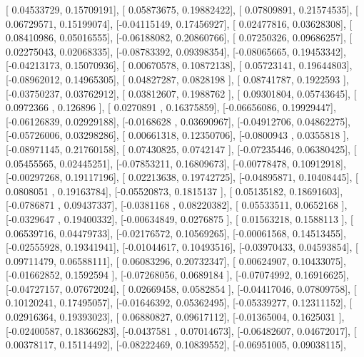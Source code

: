 \documentclass{article}
\begin{document}
       [ 0.04533729,  0.15709191],
       [ 0.05873675,  0.19882422],
       [ 0.07809891,  0.21574535],
       [ 0.06729571,  0.15199074],
       [-0.04115149,  0.17456927],
       [ 0.02477816,  0.03628308],
       [ 0.08410986,  0.05016555],
       [-0.06188082,  0.20860766],
       [ 0.07250326,  0.09686257],
       [ 0.02275043,  0.02068335],
       [-0.08783392,  0.09398354],
       [-0.08065665,  0.19453342],
       [-0.04213173,  0.15070936],
       [ 0.00670578,  0.10872138],
       [ 0.05723141,  0.19644803],
       [-0.08962012,  0.14965305],
       [ 0.04827287,  0.0828198 ],
       [ 0.08741787,  0.1922593 ],
       [-0.03750237,  0.03762912],
       [ 0.03812607,  0.1988762 ],
       [ 0.09301804,  0.05743645],
       [ 0.0972366 ,  0.126896  ],
       [ 0.0270891 ,  0.16375859],
       [-0.06656086,  0.19929447],
       [-0.06126839,  0.02929188],
       [-0.0168628 ,  0.03690967],
       [-0.04912706,  0.04862275],
       [-0.05726006,  0.03298286],
       [ 0.00661318,  0.12350706],
       [-0.0800943 ,  0.0355818 ],
       [-0.08971145,  0.21760158],
       [ 0.07430825,  0.0742147 ],
       [-0.07235446,  0.06380425],
       [ 0.05455565,  0.02445251],
       [-0.07853211,  0.16809673],
       [-0.00778478,  0.10912918],
       [-0.00297268,  0.19117196],
       [ 0.02213638,  0.19742725],
       [-0.04895871,  0.10408445],
       [ 0.0808051 ,  0.19163784],
       [-0.05520873,  0.1815137 ],
       [ 0.05135182,  0.18691603],
       [-0.0786871 ,  0.09437337],
       [-0.0381168 ,  0.08220382],
       [ 0.05533511,  0.0652168 ],
       [-0.0329647 ,  0.19400332],
       [-0.00634849,  0.0276875 ],
       [ 0.01563218,  0.1588113 ],
       [ 0.06539716,  0.04479733],
       [-0.02176572,  0.10569265],
       [-0.00061568,  0.14513455],
       [-0.02555928,  0.19341941],
       [-0.01044617,  0.10493516],
       [-0.03970433,  0.04593854],
       [ 0.09711479,  0.06588111],
       [ 0.06083296,  0.20732347],
       [ 0.00624907,  0.10433075],
       [-0.01662852,  0.1592594 ],
       [-0.07268056,  0.0689184 ],
       [-0.07074992,  0.16916625],
       [-0.04727157,  0.07672024],
       [ 0.02669458,  0.0582854 ],
       [-0.04417046,  0.07809758],
       [ 0.10120241,  0.17495057],
       [-0.01646392,  0.05362495],
       [-0.05339277,  0.12311152],
       [ 0.02916364,  0.19393023],
       [ 0.06880827,  0.09617112],
       [-0.01365004,  0.1625031 ],
       [-0.02400587,  0.18366283],
       [-0.0437581 ,  0.07014673],
       [-0.06482607,  0.04672017],
       [ 0.00378117,  0.15114492],
       [-0.08222469,  0.10839552],
       [-0.06951005,  0.09038115],
\end{document}
